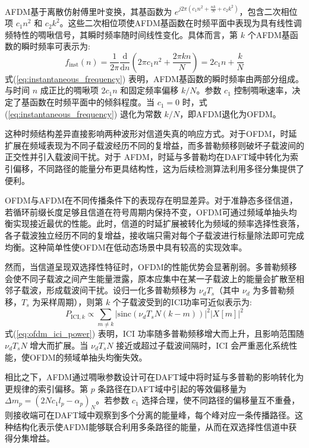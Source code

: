 AFDM基于离散仿射傅里叶变换，其基函数为 $e^{j2\pi(c_1 n^2 + \frac{nk}{N} + c_2 k^2)}$，包含二次相位项 $c_1 n^2$ 和 $c_2 k^2$。这些二次相位项使AFDM基函数在时频平面中表现为具有线性调频特性的啁啾信号，其瞬时频率随时间线性变化。具体而言，第 $k$ 个AFDM基函数的瞬时频率可表示为:                       
\begin{equation}
    f_{\mathrm{inst}}(n) = \frac{1}{2\pi}\frac{\mathrm{d}}{\mathrm{d}n}\left(2\pi c_1 n^2 + \frac{2\pi kn}{N}\right) = 2c_1 n + \frac{k}{N}
    \label{eq:instantaneous_frequency}
\end{equation}
式(\ref{eq:instantaneous_frequency}) 表明，AFDM基函数的瞬时频率由两部分组成。与时间 $n$ 成正比的啁啾项 $2c_1 n$ 和固定频率偏移 $k/N$。参数 $c_1$ 控制啁啾速率，决定了基函数在时频平面中的倾斜程度。当 $c_1=0$ 时，式(\ref{eq:instantaneous_frequency}) 退化为常数 $k/N$，即AFDM退化为OFDM。

这种时频结构差异直接影响两种波形对信道失真的响应方式。对于OFDM，时延扩展在频域表现为不同子载波经历不同的复增益，而多普勒频移则破坏子载波间的正交性并引入载波间干扰。对于 AFDM，时延与多普勒均在DAFT域中转化为索引偏移，不同路径的能量分布更具结构性，这为后续检测算法利用多径分集提供了便利。


OFDM与AFDM在不同传播条件下的表现存在明显差异。对于准静态多径信道，若循环前缀长度足够且信道在符号周期内保持不变，OFDM可通过频域单抽头均衡实现接近最优的性能。此时，信道的时延扩展被转化为频域的频率选择性衰落，各子载波独立经历不同的复增益，接收端只需对每个子载波进行标量除法即可完成均衡。这种简单性使OFDM在低动态场景中具有较高的实现效率。

然而，当信道呈现双选择性特征时，OFDM的性能优势会显著削弱。多普勒频移会使不同子载波之间产生能量泄露，原本应集中在某一子载波上的能量会扩散至相邻子载波，形成载波间干扰。设归一化多普勒频移为 $\nu_d T_s$（其中 $\nu_d$ 为多普勒频移，$T_s$ 为采样周期），则第 $k$ 个子载波受到的ICI功率可近似表示为:
\begin{equation}
    P_{\mathrm{ICI},k} \propto \sum_{m \neq k} \left|\mathrm{sinc}\left(\nu_d T_s N (k-m)\right)\right|^2 |X[m]|^2
    \label{eq:ofdm_ici_power}
\end{equation}
式(\ref{eq:ofdm_ici_power}) 表明，ICI 功率随多普勒频移增大而上升，且影响范围随 $\nu_d T_s N$ 增大而扩展。当 $\nu_d T_s N$ 接近或超过子载波间隔时，ICI 会严重恶化系统性能，使OFDM的频域单抽头均衡失效。

相比之下，AFDM通过啁啾参数设计可在DAFT域中将时延与多普勒的影响转化为更规律的索引偏移。第 $p$ 条路径在DAFT域中引起的等效偏移量为 $\Delta m_p = (2Nc_1 l_p - \alpha_p)_N$。若参数 $c_1$ 选择合理，使不同路径的偏移量互不重叠，则接收端可在DAFT域中观察到多个分离的能量峰，每个峰对应一条传播路径。这种结构化表示使AFDM能够联合利用多条路径的能量，从而在双选择性信道中获得分集增益。

